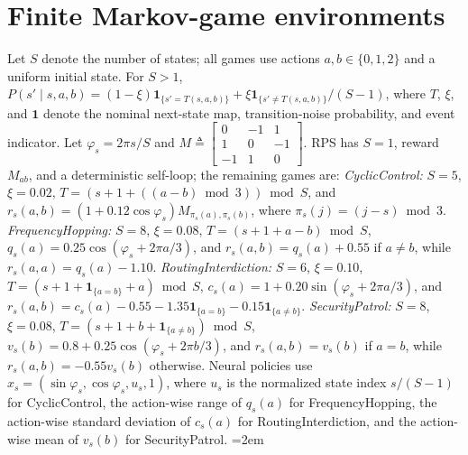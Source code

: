 \documentclass[journal]{IEEEtran}
\theoremstyle{remark}
\begin{document}
	\section{Finite Markov-game environments}\label{app:environments}
	Let $S$ denote the number of states; all games use actions $a,b\in\{0,1,2\}$ and a uniform initial state.
	For $S>1$, $P(s'\mid s,a,b)=(1-\xi)\mathbf 1_{\{s'=T(s,a,b)\}}+\xi\mathbf 1_{\{s'\ne T(s,a,b)\}}/(S-1)$, where $T$, $\xi$, and $\mathbf 1$ denote the nominal next-state map, transition-noise probability, and event indicator.
	Let $\varphi_s=2\pi s/S$ and $M\triangleq\left[\begin{smallmatrix}0&-1&1\\1&0&-1\\-1&1&0\end{smallmatrix}\right]$.
	RPS has $S=1$, reward $M_{ab}$, and a deterministic self-loop; the remaining games are: \emph{CyclicControl:} $S=5$, $\xi=0.02$, $T=(s+1+((a-b)\bmod3))\bmod S$, and $r_s(a,b)=(1+0.12\cos\varphi_s)M_{\pi_s(a),\pi_s(b)}$, where $\pi_s(j)=(j-s)\bmod3$.
	\emph{FrequencyHopping:} $S=8$, $\xi=0.08$, $T=(s+1+a-b)\bmod S$, $q_s(a)=0.25\cos(\varphi_s+2\pi a/3)$, and $r_s(a,b)=q_s(a)+0.55$ if $a\ne b$, while $r_s(a,a)=q_s(a)-1.10$.
	\emph{RoutingInterdiction:} $S=6$, $\xi=0.10$, $T=(s+1+\mathbf 1_{\{a=b\}}+a)\bmod S$, $c_s(a)=1+0.20\sin(\varphi_s+2\pi a/3)$, and $r_s(a,b)=c_s(a)-0.55-1.35\mathbf 1_{\{a=b\}}-0.15\mathbf 1_{\{a\ne b\}}$.
	\emph{SecurityPatrol:} $S=8$, $\xi=0.08$, $T=(s+1+b+\mathbf 1_{\{a\ne b\}})\bmod S$, $v_s(b)=0.8+0.25\cos(\varphi_s+2\pi b/3)$, and $r_s(a,b)=v_s(b)$ if $a=b$, while $r_s(a,b)=-0.55v_s(b)$ otherwise.
	Neural policies use $x_s=(\sin\varphi_s,\cos\varphi_s,u_s,1)$, where $u_s$ is the normalized state index $s/(S-1)$ for CyclicControl, the action-wise range of $q_s(a)$ for FrequencyHopping, the action-wise standard deviation of $c_s(a)$ for RoutingInterdiction, and the action-wise mean of $v_s(b)$ for SecurityPatrol.
\begingroup
\emergencystretch=2em
	
	
	\endgroup
\end{document}
